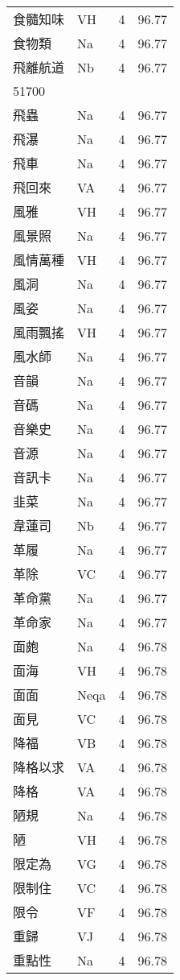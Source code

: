 \documentclass[twocolumn]{book}
\begin{document}
\begin{supertabular}{llrr}
食髓知味 & VH & 4 &  96.77\\
食物類 & Na & 4 &  96.77\\
飛離航道 & Nb & 4 &  96.77\\
51700\\
飛蟲 & Na & 4 &  96.77\\
飛瀑 & Na & 4 &  96.77\\
飛車 & Na & 4 &  96.77\\
飛回來 & VA & 4 &  96.77\\
風雅 & VH & 4 &  96.77\\
風景照 & Na & 4 &  96.77\\
風情萬種 & VH & 4 &  96.77\\
風洞 & Na & 4 &  96.77\\
風姿 & Na & 4 &  96.77\\
風雨飄搖 & VH & 4 &  96.77\\
風水師 & Na & 4 &  96.77\\
音韻 & Na & 4 &  96.77\\
音碼 & Na & 4 &  96.77\\
音樂史 & Na & 4 &  96.77\\
音源 & Na & 4 &  96.77\\
音訊卡 & Na & 4 &  96.77\\
韭菜 & Na & 4 &  96.77\\
韋蓮司 & Nb & 4 &  96.77\\
革履 & Na & 4 &  96.77\\
革除 & VC & 4 &  96.77\\
革命黨 & Na & 4 &  96.77\\
革命家 & Na & 4 &  96.77\\
面皰 & Na & 4 &  96.78\\
面海 & VH & 4 &  96.78\\
面面 & Neqa & 4 &  96.78\\
面見 & VC & 4 &  96.78\\
降福 & VB & 4 &  96.78\\
降格以求 & VA & 4 &  96.78\\
降格 & VA & 4 &  96.78\\
陋規 & Na & 4 &  96.78\\
陋 & VH & 4 &  96.78\\
限定為 & VG & 4 &  96.78\\
限制住 & VC & 4 &  96.78\\
限令 & VF & 4 &  96.78\\
重歸 & VJ & 4 &  96.78\\
重點性 & Na & 4 &  96.78\\

\end{supertabular}
\end{document}
